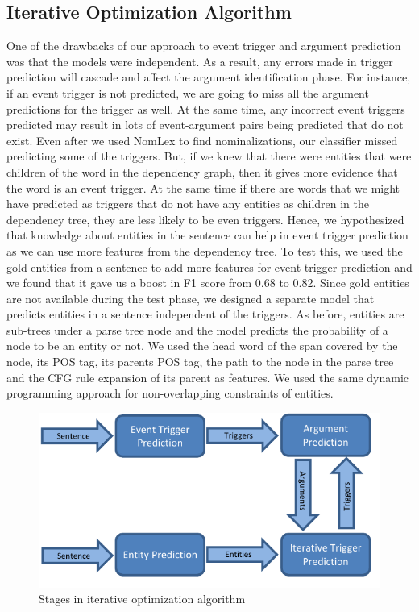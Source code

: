 \subsection{Iterative Optimization Algorithm}
One of the drawbacks of our approach to event trigger and argument prediction was that the models were independent. As a result, any errors made in trigger prediction will cascade and affect the argument identification phase. For instance, if an event trigger is not predicted, we are going to miss all the argument predictions for the trigger as well. At the same time, any incorrect event triggers predicted may result in lots of event-argument pairs being predicted that do not exist. Even after we used NomLex to find nominalizations, our classifier missed predicting some of the triggers. But, if we knew that there were entities that were children of the word in the dependency graph, then it gives more evidence that the word is an event trigger. At the same time if there are words that we might have predicted as triggers that do not have any entities as children in the dependency tree, they are less likely to be even triggers. Hence, we hypothesized that knowledge about entities in the sentence can help in event trigger prediction as we can use more features from the dependency tree. To test this, we used the gold entities from a sentence to add more features for event trigger prediction and we found that it gave us a boost in F1 score from 0.68 to 0.82. Since gold entities are not available during the test phase, we designed a separate model that predicts entities in a sentence independent of the triggers. As before, entities are sub-trees under a parse tree node and the model predicts the probability of a node to be an entity or not. We used the head word of the span covered by the node, its POS tag, its parents POS tag, the path to the node in the parse tree and the CFG rule expansion of its parent as features. We used the same dynamic programming approach for non-overlapping constraints of entities.

\begin{figure}[t]
	\includegraphics[width=1\columnwidth]{Images/IO}
	\caption{Stages in iterative optimization algorithm}
	\label{fig:iosteps}
\end{figure}

